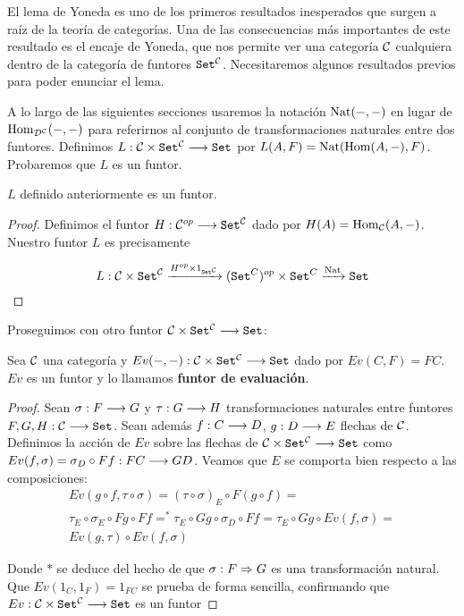 El lema de Yoneda es uno de los primeros resultados
inesperados que surgen a raíz de la teoría de categorías. Una
de las consecuencias más importantes de este resultado es
el encaje de Yoneda, que nos permite
ver una categoría $\mathcal{C}$ cualquiera dentro de la categoría de
funtores $\texttt{Set}^{\mathcal{C}}$. Necesitaremos algunos resultados
previos para poder enunciar el lema.

A lo largo de las siguientes
secciones usaremos la notación $\operatorname{Nat}(-, -)$ en lugar de
$\operatorname{Hom}_{\mathcal{D}^{\mathcal{C}}}(-, -)$ para referirnos al conjunto de
transformaciones naturales entre dos funtores. Definimos
$L : \mathcal{C}\times\texttt{Set}^{\mathcal{C}}\longrightarrow \texttt{Set}$ por
$L(A, F) = \operatorname{Nat}(\operatorname{Hom}(A, -), F)$. Probaremos que $L$ es un funtor.

\begin{proposition*}
  $L$ definido anteriormente es un funtor.
\end{proposition*}
\begin{proof}
  Definimos el funtor
  $H: \mathcal{C}^{op}\longrightarrow \texttt{Set}^{\mathcal{C}}$ dado por
  $H(A) = \operatorname{Hom}_{\mathcal{C}}(A, -)$. Nuestro funtor $L$ es precisamente

  $$L :\mathcal{C}\times\texttt{Set}^{\mathcal{C}}
  \xrightarrow{H^{op}\times 1_{\texttt{Set}^{\mathcal{C}}}}
  (\texttt{Set}^{C})^{op} \times \texttt{Set}^{C}
  \xrightarrow{\operatorname{Nat}} \texttt{Set}$$
\end{proof}
Proseguimos con otro funtor $\mathcal{C}\times\texttt{Set}^{\mathcal{C}}\longrightarrow \texttt{Set}$:

\begin{proposition*}
  Sea $\mathcal{C}$ una categoría y $Ev(-, -) : \mathcal{C}\times\texttt{Set}^{\mathcal{C}}\longrightarrow \texttt{Set}$
  dado por $Ev(C, F) = FC$. $Ev$ es un funtor y lo llamamos
  \textbf{funtor de evaluación}.
\end{proposition*}
\begin{proof}
  Sean $\sigma : F\longrightarrow G$ y $\tau : G\longrightarrow H$ transformaciones naturales entre funtores
  $F, G, H : \mathcal{C}\longrightarrow \texttt{Set}$. Sean además $f : C\longrightarrow D$,
  $g : D\longrightarrow E$ flechas de $\mathcal{C}$.
  Definimos la acción de $Ev$ sobre las flechas de
  $\mathcal{C}\times\texttt{Set}^{\mathcal{C}}\longrightarrow \texttt{Set}$ como
  $Ev(f, \sigma) = \sigma_D \circ Ff : FC\longrightarrow GD$. Veamos que $E$ se comporta bien
  respecto a las composiciones:
  \begin{multline*}
    Ev(g \circ f, \tau\circ\sigma) =
    (\tau \circ \sigma)_E\circ F(g\circ f) =\\
    \tau_E\circ\sigma_E\circ Fg \circ Ff =^*
  \tau_E\circ Gg \circ\sigma_D \circ Ff =
  \tau_E\circ Gg \circ Ev(f, \sigma) =\\
  Ev(g, \tau) \circ Ev(f, \sigma)
  \end{multline*}

  Donde $*$ se deduce del hecho de que $\sigma : F\Rightarrow G$ es una transformación
  natural.
  Que $Ev(1_C, 1_F) = 1_{FC}$ se prueba de forma sencilla,
  confirmando que $Ev : \mathcal{C}\times\texttt{Set}^{\mathcal{C}}\longrightarrow \texttt{Set}$ es un funtor
\end{proof}

